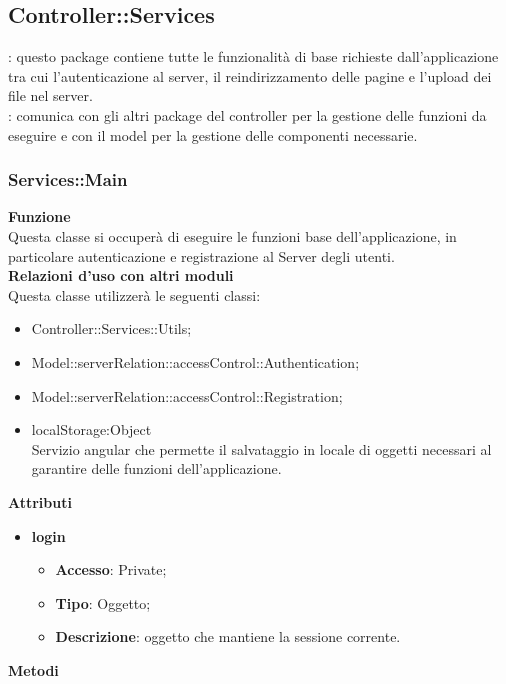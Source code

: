 {	\subsection {Controller::\-Services}{
		\label{sec:services}
		\textbf{\tipo}: questo package contiene tutte le funzionalità di base richieste dall'applicazione tra cui l'autenticazione al server, il reindirizzamento delle pagine e l'upload dei file nel server. \\
		\textbf{\relaz}: comunica con gli altri package del controller per la gestione delle funzioni da eseguire e con il model per la gestione delle componenti necessarie.

		\subsubsection{Services::\-Main}{
			\label{sub:servicesMain}
			\textbf{Funzione}\\
			\indent Questa classe si occuperà di eseguire le funzioni base dell'applicazione, in particolare autenticazione e registrazione al Server degli utenti.\\
			\textbf{Relazioni d'uso con altri moduli}\\
			\indent Questa classe utilizzerà le seguenti classi:
			\begin{itemize}
				\item Controller::Services::\-Utils;
				\item Model::serverRelation::accessControl::Authentication;
				\item Model::serverRelation::accessControl::Registration;
				\item localStorage:Object\\
					\indent Servizio angular che permette il salvataggio in locale di oggetti necessari al  garantire delle funzioni dell'applicazione.
			\end{itemize}
			\textbf{Attributi}
			\begin{itemize}
				\item \textbf{login}
				\begin{itemize}
					\item \textbf{Accesso}: Private;
					\item \textbf{Tipo}: Oggetto;
					\item \textbf{Descrizione}: oggetto che mantiene la sessione corrente.
				\end{itemize}
			\end{itemize}
			\textbf{Metodi}
			\begin{itemize}

\end{itemize}}}}
